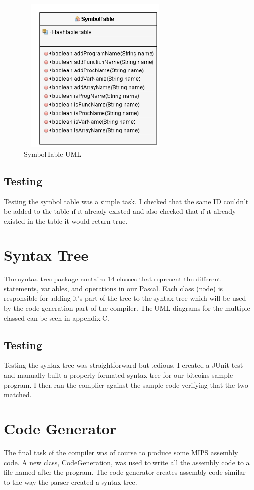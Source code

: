 \documentclass[10]{article}
\begin{document}
\begin{figure}[!thp]
	\centering
	\includegraphics[width=3in, height=3in]{SymTableUML.png}
	\caption{SymbolTable UML \label{fig: fg4}}
\end{figure}

\subsection{Testing}
Testing the symbol table was a simple task. I checked that the same ID couldn't be added to the table if it already existed and also checked that if it already existed in the table it would return true.

\section{Syntax Tree}
The syntax tree package contains 14 classes that represent the different statements, variables, and operations in our Pascal. Each class (node) is responsible for adding it's part of the tree to the syntax tree which will be used by the code generation part of the compiler. The UML diagrams for the multiple classed can be seen in appendix C.

\subsection{Testing}
Testing the syntax tree was straightforward but tedious. I created a JUnit test and manually built a properly formated syntax tree for our bitcoins sample program. I then ran the complier against the sample code verifying that the two matched. 



\section{Code Generator}
The final task of the compiler was of course to produce some MIPS assembly code. A new class, CodeGeneration, was used to write all the assembly code to a file named after the program. The code generator creates assembly code similar to the way the parser created a syntax tree. 
\end{document}
